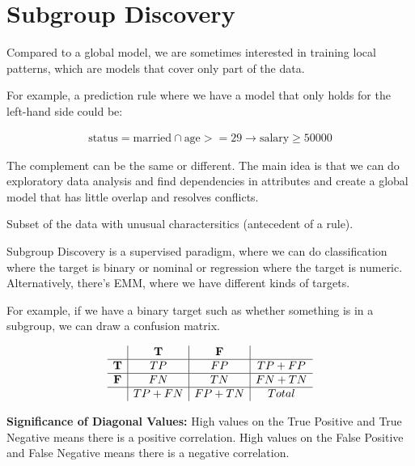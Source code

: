 \section{Subgroup Discovery}

Compared to a global model, we are sometimes interested
in training local patterns, which are models that cover
only part of the data.

For example, a prediction rule
where we have a model that only holds for the left-hand
side could be:

\begin{align*}
  \text{status} =
  \text{married} \cap \text{age} >= 29 \rightarrow
  \text{salary} \geq 50000
\end{align*}

The complement can be the same or different. The main idea
is that we can do exploratory data analysis and find dependencies
in attributes and create a global model that has little overlap
and resolves conflicts.

\begin{definition}[Subgroup]
  Subset of the data with unusual charactersitics (antecedent of a rule).
\end{definition}

Subgroup Discovery is a supervised paradigm, where we can do
classification where the target is binary or nominal or regression
where the target is numeric. Alternatively, there's EMM, where we
have different kinds of targets.

For example, if we have a binary target such as whether something
is in a subgroup, we can draw a confusion matrix.

\begin{definition}
  \[
    \begin{array}{c|c|c|c}
      & \textbf{T} & \textbf{F} & \\ \hline
      \textbf{T} & TP & FP & TP + FP \\ \hline
      \textbf{F} & FN & TN & FN + TN \\ \hline
      & TP + FN & FP + TN & Total \\
    \end{array}
  \]

  \textbf{Significance of Diagonal Values:} High values on the
  True Positive and True Negative means there is a positive
  correlation. High values on the False Positive and False Negative
  means there is a negative correlation.
\end{definition}

